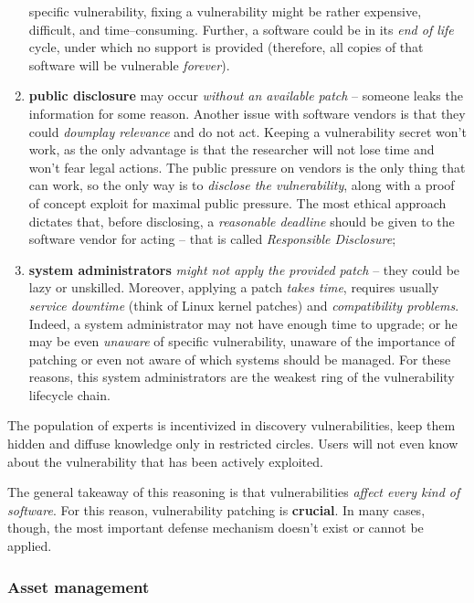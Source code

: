 \documentclass[10pt]{extbook}
\begin{document}
\begin{enumerate}
        specific vulnerability, fixing a vulnerability might be rather
        expensive, difficult, and time--consuming. Further, a software could be
        in its \emph{end of life} cycle, under which no support is provided
        (therefore, all copies of that software will be vulnerable
        \emph{forever}).
    \item \textbf{public disclosure} may occur \emph{without an available patch}
        -- someone leaks the information for some reason. Another issue with
        software vendors is that they could \emph{downplay relevance} and do
        not act. Keeping a vulnerability secret won't work, as the only
        advantage is that the researcher will not lose time and won't fear
        legal actions. The public pressure on vendors is the only thing that
        can work, so the only way is to \emph{disclose the vulnerability},
        along with a proof of concept exploit for maximal public pressure. The
        most ethical approach dictates that, before disclosing, a
        \emph{reasonable deadline} should be given to the software vendor for
        acting -- that is called \emph{Responsible Disclosure};
    \item \textbf{system administrators} \emph{might not apply the provided
        patch} -- they could be lazy or unskilled. Moreover, applying a patch
        \emph{takes time}, requires usually \emph{service downtime} (think of
        Linux kernel patches) and \emph{compatibility problems}. Indeed, a
        system administrator may not have enough time to upgrade; or he may be
        even \emph{unaware} of specific vulnerability, unaware of the
        importance of patching or even not aware of which systems should be
        managed. For these reasons, this system administrators are the weakest
        ring of the vulnerability lifecycle chain.
\end{enumerate}

The population of experts is incentivized in discovery vulnerabilities, keep
them hidden and diffuse knowledge only in restricted circles. Users will not
even know about the vulnerability that has been actively exploited.

The general takeaway of this reasoning is that vulnerabilities \emph{affect
every kind of software}. For this reason, vulnerability patching is
\textbf{crucial}. In many cases, though, the most important defense mechanism
doesn't exist or cannot be applied.

\subsubsection{Asset management}
\end{document}
